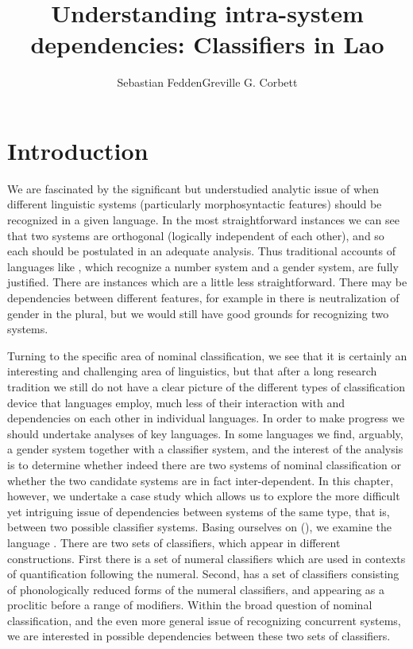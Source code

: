 \documentclass[output=paper]{langsci/langscibook}
\author{Sebastian Fedden\affiliation{{The University of Sydney}}\lastand Greville G. Corbett\affiliation{{University of Surrey}}}
\title{Understanding intra-system dependencies: Classifiers in Lao}
\begin{document}
 
\maketitle

\section{Introduction}

   We are fascinated by the significant but understudied analytic issue of when different linguistic systems (particularly morphosyntactic features) should be recognized in a given language. In the most straightforward instances we can see that two systems are orthogonal (logically independent of each other), and so each should be postulated in an adequate analysis. Thus traditional accounts of languages like , which recognize a number system and a gender system, are fully justified. There are instances which are a little less straightforward. There may be dependencies between different features, for example in  there is neutralization of gender in the plural, but we would still have good grounds for recognizing two systems. 

  Turning to the specific area of nominal classification, we see that it is certainly an interesting and challenging area of linguistics, but that after a long research tradition we still do not have a clear picture of the different types of classification device that languages employ, much less of their interaction with and dependencies on each other in individual languages. In order to make progress we should undertake analyses of key languages. In some languages we find, arguably, a gender system together with a classifier system, and the interest of the analysis is to determine whether indeed there are two systems of nominal classification or whether the two candidate systems are in fact inter-dependent. In this chapter, however, we undertake a case study which allows us to explore the more difficult yet intriguing issue of dependencies between systems of the same type, that is, between two possible classifier systems.  Basing ourselves on \citeauthor{Enfield2004}  (), we examine the  language . There are two sets of classifiers, which appear in different constructions. First there is a set of numeral classifiers which are used in contexts of quantification following the numeral.  Second,  has a set of classifiers consisting of phonologically reduced forms of the numeral classifiers, and appearing as a proclitic before a range of modifiers. Within the broad question of nominal classification, and the even more general issue of recognizing concurrent systems, we are interested in possible dependencies between these two sets of classifiers. 
\end{document}
